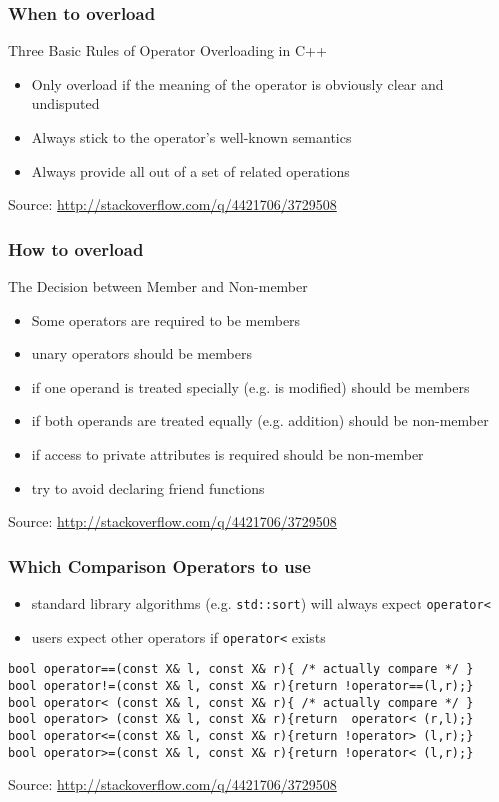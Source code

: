 \begin{frame}[fragile]
    \frametitle{When to overload}
    Three Basic Rules of Operator Overloading in C++
    \begin{itemize}
        \item Only overload if the meaning of the operator is obviously clear and undisputed
        \item Always stick to the operator's well-known semantics
        \item Always provide all out of a set of related operations
    \end{itemize}
    Source: \href{http://stackoverflow.com/q/4421706/3729508}{http://stackoverflow.com/q/4421706/3729508}
\end{frame}

\begin{frame}[fragile]
    \frametitle{How to overload}
    The Decision between Member and Non-member
    \begin{itemize}
        \item Some operators are required to be members
        \item unary operators should be members
        \item if one operand is treated specially (e.g. is modified) should be members
        \item if both operands are treated equally (e.g. addition) should be non-member
        \item if access to private attributes is required should be non-member
        \item try to avoid declaring friend functions
    \end{itemize}
    Source: \href{http://stackoverflow.com/q/4421706/3729508}{http://stackoverflow.com/q/4421706/3729508}
\end{frame}

\begin{frame}[fragile]
    \frametitle{Which Comparison Operators to use}
    \begin{itemize}
        \item standard library algorithms (e.g. \lstinline{std::sort}) will always expect \lstinline{operator<}
        \item users expect other operators if \lstinline{operator<} exists
    \end{itemize}
    \footnotesize
    \begin{lstlisting}[numbers=none]
bool operator==(const X& l, const X& r){ /* actually compare */ }
bool operator!=(const X& l, const X& r){return !operator==(l,r);}
bool operator< (const X& l, const X& r){ /* actually compare */ }
bool operator> (const X& l, const X& r){return  operator< (r,l);}
bool operator<=(const X& l, const X& r){return !operator> (l,r);}
bool operator>=(const X& l, const X& r){return !operator< (l,r);}
    \end{lstlisting}
    Source: \href{http://stackoverflow.com/q/4421706/3729508}{http://stackoverflow.com/q/4421706/3729508}
\end{frame}

